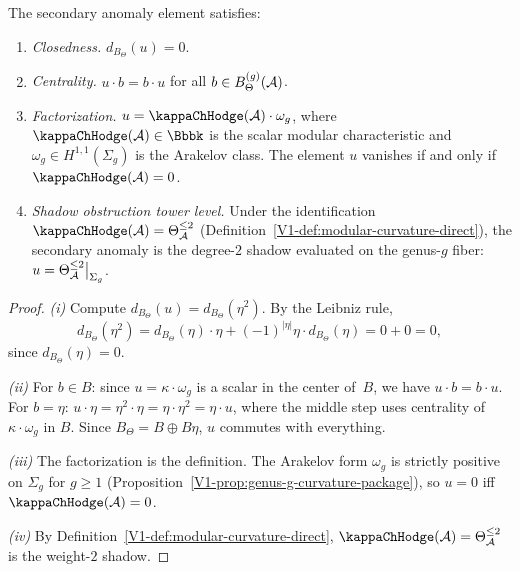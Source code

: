 \begin{proposition}
The secondary anomaly element satisfies:
\begin{enumerate}[label=\textup{(\roman*)}]
\item \emph{Closedness.}\; $d_{B_\Theta}(u) = 0$.

\item \emph{Centrality.}\; $u \cdot b = b \cdot u$ for all $b \in
B_\Theta^{(g)}(\mathcal{A})$.

\item \emph{Factorization.}\; $u = \kappaChHodge(\cA) \cdot \omega_g$, where
$\kappaChHodge(\cA) \in \Bbbk$ is the scalar modular characteristic and
$\omega_g \in H^{1,1}(\Sigma_g)$ is the Arakelov class. The element
$u$ vanishes if and only if $\kappaChHodge(\cA) = 0$.

\item \emph{Shadow obstruction tower level.}\; Under the identification
$\kappaChHodge(\cA) = \Theta_\cA^{\leq 2}$
(Definition~\ref{V1-def:modular-curvature-direct}), the
secondary anomaly is the degree-$2$ shadow evaluated on the genus-$g$
fiber: $u = \Theta_{\mathcal{A}}^{\leq 2}\big|_{\Sigma_g}$.
\end{enumerate}
\end{proposition}

\begin{proof}
\emph{(i)} Compute $d_{B_\Theta}(u) = d_{B_\Theta}(\eta^2)$. By the
Leibniz rule,
\[
d_{B_\Theta}(\eta^2) = d_{B_\Theta}(\eta) \cdot \eta
+ (-1)^{|\eta|}\eta \cdot d_{B_\Theta}(\eta) = 0 + 0 = 0,
\]
since $d_{B_\Theta}(\eta) = 0$.

\emph{(ii)} For $b \in B$: since $u = \kappa \cdot \omega_g$ is a
scalar in the center of~$B$, we have $u \cdot b = b \cdot u$. For
$b = \eta$: $u \cdot \eta = \eta^2 \cdot \eta = \eta \cdot \eta^2 =
\eta \cdot u$, where the middle step uses centrality of
$\kappa \cdot \omega_g$ in $B$. Since $B_\Theta = B \oplus B\eta$,
$u$ commutes with everything.

\emph{(iii)} The factorization is the definition. The Arakelov form
$\omega_g$ is strictly positive on $\Sigma_g$ for $g \geq 1$
(Proposition~\ref{V1-prop:genus-g-curvature-package}), so $u = 0$
iff $\kappaChHodge(\cA) = 0$.

\emph{(iv)} By Definition~\ref{V1-def:modular-curvature-direct},
$\kappaChHodge(\cA) = \Theta_\cA^{\leq 2}$ is the weight-$2$ shadow.
\end{proof}

